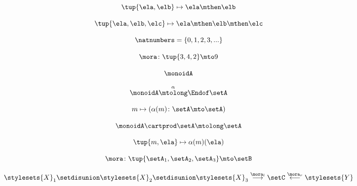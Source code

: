 \begin{forslides}
     \begin{equation}
        \label{eq:slides_multicategories_46}
       \tup{\ela, \elb} \mapsto \ela \mthen \elb
    \end{equation}
    
     \begin{equation}
        \label{eq:slides_multicategories_47}
      \tup{\ela, \elb, \elc} \mapsto \ela \mthen \elb \mthen \elc
    \end{equation}
    
     \begin{equation}
        \label{eq:slides_multicategories_48}
      \natnumbers = \{0, 1, 2, 3, ... \}
    \end{equation}
    
    \begin{equation}
        \label{eq:slides_multicategories_49}
       \mora \colon \tup{3,4,2} \mto 9
    \end{equation}
    
     \begin{equation}
        \label{eq:slides_multicategories_50}
       \monoidA 
    \end{equation}
    
    \begin{equation}
        \label{eq:slides_multicategories_51}
       \monoidA \overset{\alpha}{\mtolong} \Endof \setA
    \end{equation}
    
     \begin{equation}
        \label{eq:slides_multicategories_52}
       m \mapsto ( \alpha(m) \colon \setA \mto \setA)
    \end{equation}
    
     \begin{equation}
        \label{eq:slides_multicategories_53}
      \monoidA \cartprod \setA \mtolong \setA
    \end{equation}
    
     \begin{equation}
        \label{eq:slides_multicategories_54}
      \tup{m, \ela} \mapsto \alpha(m)(\ela)
    \end{equation}
    
    \begin{equation}
        \label{eq:slides_multicategories_55}
       \mora \colon \tup{\setA_1, \setA_2, \setA_3} \mto \setB
    \end{equation}
    
     \begin{equation}
        \label{eq:slides_multicategories_56}
       \stylesets{X}_1 \setdisunion  \stylesets{X}_2 \setdisunion  \stylesets{X}_3 \overset{\mora_l}{\longrightarrow} \setC \overset{\mora_r}{\longleftarrow}  \stylesets{Y}
    \end{equation}
    

\end{forslides}

